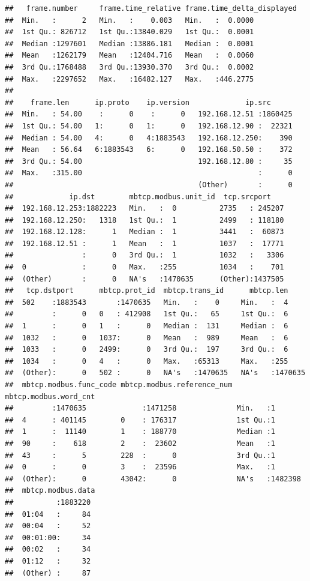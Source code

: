 \documentclass[]{article}
\begin{document}
\begin{verbatim}
##   frame.number     frame.time_relative frame.time_delta_displayed
##  Min.   :      2   Min.   :    0.003   Min.   :  0.0000          
##  1st Qu.: 826712   1st Qu.:13840.029   1st Qu.:  0.0001          
##  Median :1297601   Median :13886.181   Median :  0.0001          
##  Mean   :1262179   Mean   :12404.716   Mean   :  0.0060          
##  3rd Qu.:1768488   3rd Qu.:13930.370   3rd Qu.:  0.0002          
##  Max.   :2297652   Max.   :16482.127   Max.   :446.2775          
##                                                                  
##    frame.len      ip.proto    ip.version             ip.src       
##  Min.   : 54.00    :      0    :      0   192.168.12.51 :1860425  
##  1st Qu.: 54.00   1:      0   1:      0   192.168.12.90 :  22321  
##  Median : 54.00   4:      0   4:1883543   192.168.12.250:    390  
##  Mean   : 56.64   6:1883543   6:      0   192.168.50.50 :    372  
##  3rd Qu.: 54.00                           192.168.12.80 :     35  
##  Max.   :315.00                                         :      0  
##                                           (Other)       :      0  
##             ip.dst        mbtcp.modbus.unit_id  tcp.srcport     
##  192.168.12.253:1882223   Min.   :  0          2735   : 245207  
##  192.168.12.250:   1318   1st Qu.:  1          2499   : 118180  
##  192.168.12.128:      1   Median :  1          3441   :  60873  
##  192.168.12.51 :      1   Mean   :  1          1037   :  17771  
##                :      0   3rd Qu.:  1          1032   :   3306  
##  0             :      0   Max.   :255          1034   :    701  
##  (Other)       :      0   NA's   :1470635      (Other):1437505  
##   tcp.dstport      mbtcp.prot_id  mbtcp.trans_id      mbtcp.len      
##  502    :1883543       :1470635   Min.   :    0     Min.   :  4      
##         :      0   0   : 412908   1st Qu.:   65     1st Qu.:  6      
##  1      :      0   1   :      0   Median :  131     Median :  6      
##  1032   :      0   1037:      0   Mean   :  989     Mean   :  6      
##  1033   :      0   2499:      0   3rd Qu.:  197     3rd Qu.:  6      
##  1034   :      0   4   :      0   Max.   :65313     Max.   :255      
##  (Other):      0   502 :      0   NA's   :1470635   NA's   :1470635  
##  mbtcp.modbus.func_code mbtcp.modbus.reference_num mbtcp.modbus.word_cnt
##         :1470635             :1471258              Min.   :1            
##  4      : 401145        0    : 176317              1st Qu.:1            
##  1      :  11140        1    : 188770              Median :1            
##  90     :    618        2    :  23602              Mean   :1            
##  43     :      5        228  :      0              3rd Qu.:1            
##  0      :      0        3    :  23596              Max.   :1            
##  (Other):      0        43042:      0              NA's   :1482398      
##  mbtcp.modbus.data 
##          :1883220  
##  01:04   :     84  
##  00:04   :     52  
##  00:01:00:     34  
##  00:02   :     34  
##  01:12   :     32  
##  (Other) :     87
\end{verbatim}
\end{document}
